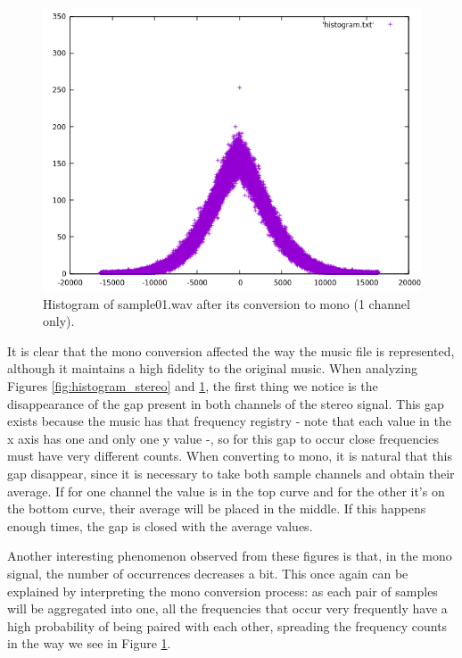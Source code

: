 \documentclass[12pt]{article}
\begin{document}
\begin{figure}[H]
  \centering
  \begin{minipage}{.5\textwidth}
    \centering
    \includegraphics[width=\linewidth]{sample01_16_1.png}
  \end{minipage}%
  \caption{Histogram of sample01.wav after its conversion to mono (1 channel only).}
  \label{fig:histogram_mono}
\end{figure}

It is clear that the mono conversion affected the way the music file is 
represented, although it maintains a high fidelity to the original music. 
When analyzing Figures \ref{fig:histogram_stereo} and \ref{fig:histogram_mono}, 
the first thing we notice is the disappearance of the gap present in both 
channels of the stereo signal. 
This gap exists because the music has that frequency registry - note that each 
value in the x axis has one and only one y value -, so for this gap to occur 
close frequencies must have very different counts. 
When converting to mono, it is natural that this gap disappear, since it is 
necessary to take both sample channels and obtain their average.
If for one channel the value is in the top curve and for the other it's on the 
bottom curve, their average will be placed in the middle.
If this happens enough times, the gap is closed with the average values. 

\newpage
Another interesting phenomenon observed from these figures is that, in the mono 
signal, the number of occurrences decreases a bit. 
This once again can be explained by interpreting the mono conversion process: 
as each pair of samples will be aggregated into one, all the frequencies that 
occur very frequently have a high probability of being paired with each other, 
spreading the frequency counts in the way we see in Figure \ref{fig:histogram_mono}.
\end{document}
